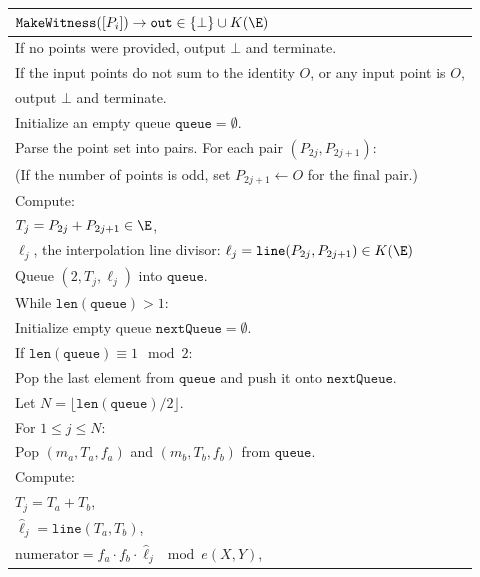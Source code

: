 \documentclass[11pt,letterpaper]{article}
\theoremstyle{definition}
\newcommand{\6}{\mathbf}
\newcommand{\7}{\mathcal}
\begin{document}
\begin{table}[H]
    \centering
    \begin{tabular}{|l|}
    \hline
    $\texttt{MakeWitness}([P_i]) \to \texttt{out} \in \{\bot\} \cup K(\E)$ \\
    \hline
    If no points were provided, output $\bot$ and terminate. \\
    If the input points do not sum to the identity $O$, or any input point is $O$, \\
    \quad output $\bot$ and terminate. \\
    Initialize an empty queue $\texttt{queue} = \emptyset$. \\
    Parse the point set into pairs. For each pair $(P_{2j},P_{2j+1})$: \\
    \quad (If the number of points is odd, set $P_{2j+1} \leftarrow O$ for the final pair.) \\
    \quad Compute: \\
    \quad\quad $T_j = P_{2j} + P_{2j+1} \in \E$,\\
    \quad\quad $\ell_j$, the interpolation line divisor: $\ell_j = \texttt{line}(P_{2j},P_{2j+1}) \in K(\E)$ \\
    \quad Queue $(2, T_j, \ell_j)$ into $\texttt{queue}$. \\
    While $\texttt{len}(\texttt{queue}) > 1$: \\
    \quad Initialize empty queue $\texttt{nextQueue} = \emptyset$. \\
    \quad If $\texttt{len}(\texttt{queue}) \equiv 1 \mod 2$: \\
    \quad\quad Pop the last element from $\texttt{queue}$ and push it onto $\texttt{nextQueue}$. \\
    \quad Let $N = \lfloor\texttt{len}(\texttt{queue})/2\rfloor$. \\
    \quad For $1 \leq j \leq N$: \\
    \quad\quad Pop $(m_a, T_a, f_a)$ and $(m_b, T_b, f_b)$ from $\texttt{queue}$. \\
    \quad\quad Compute: \\
    \quad\quad\quad $T_{j} = T_{a} + T_{b}$,\\
    \quad\quad\quad $\widehat{\ell}_j = \texttt{line}(T_{a}, T_{b})$,\\
    \quad\quad\quad $\text{numerator} = f_{a} \cdot f_{b} \cdot \widehat{\ell}_j \mod e(X,Y)$,\\

\end{tabular}
\end{table}
\end{document}
